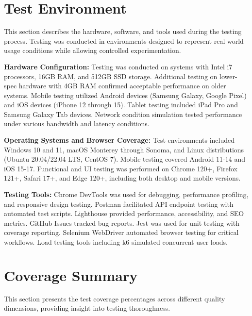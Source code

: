 \section{Test Environment}

\justifying
\noindent This section describes the hardware, software, and tools used during the testing process. Testing was conducted in environments designed to represent real-world usage conditions while allowing controlled experimentation.

\justifying
\noindent \textbf{Hardware Configuration:} Testing was conducted on systems with Intel i7 processors, 16GB RAM, and 512GB SSD storage. Additional testing on lower-spec hardware with 4GB RAM confirmed acceptable performance on older systems. Mobile testing utilized Android devices (Samsung Galaxy, Google Pixel) and iOS devices (iPhone 12 through 15). Tablet testing included iPad Pro and Samsung Galaxy Tab devices. Network condition simulation tested performance under various bandwidth and latency conditions.

\justifying
\noindent \textbf{Operating Systems and Browser Coverage:} Test environments included Windows 10 and 11, macOS Monterey through Sonoma, and Linux distributions (Ubuntu 20.04/22.04 LTS, CentOS 7). Mobile testing covered Android 11-14 and iOS 15-17. Functional and UI testing was performed on Chrome 120+, Firefox 121+, Safari 17+, and Edge 120+, including both desktop and mobile versions.

\justifying
\noindent \textbf{Testing Tools:} Chrome DevTools was used for debugging, performance profiling, and responsive design testing. Postman facilitated API endpoint testing with automated test scripts. Lighthouse provided performance, accessibility, and SEO metrics. GitHub Issues tracked bug reports. Jest was used for unit testing with coverage reporting. Selenium WebDriver automated browser testing for critical workflows. Load testing tools including k6 simulated concurrent user loads.

\section{Coverage Summary}

\justifying
\noindent This section presents the test coverage percentages across different quality dimensions, providing insight into testing thoroughness.

